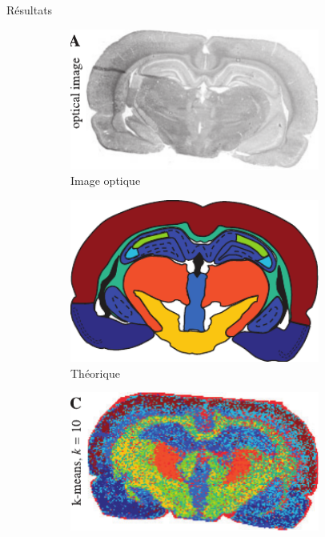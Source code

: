 \documentclass[10pt]{beamer}
\begin{document}
\begin{frame}{Résultats}
  \begin{figure}[ht]
    \centering
    \begin{subfigure}[t]{0.33\textwidth}
      \centering
      \includegraphics[width=0.9\textwidth]{fig/clustering_optical.pdf}
      \caption{Image optique}
      \label{subfig:clustering_optical.pdf}
    \end{subfigure}%
        \begin{subfigure}[t]{0.33\textwidth}
      \centering
      \includegraphics[width=0.9\textwidth]{fig/clustering_theoretical.pdf}
      \caption{Théorique}
      \label{subfig:clustering_th}
    \end{subfigure}%
        \begin{subfigure}[t]{0.33\textwidth}
      \centering
      \includegraphics[width=0.9\textwidth]{fig/clustering_kmeans.pdf}

\end{subfigure}
\end{figure}
\end{frame}
\end{document}
